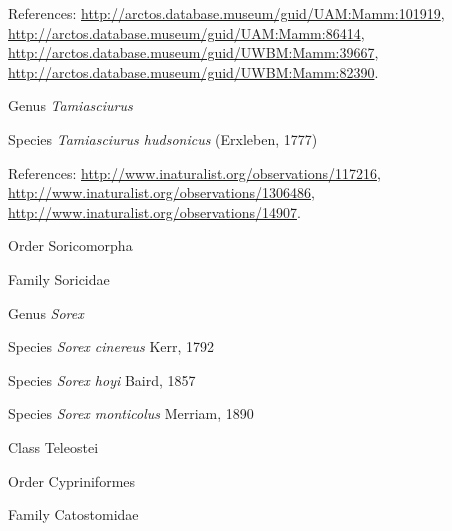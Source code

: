 \documentclass[9pt, article]{memoir}
\begin{document}
\begin{multicols}{2}
\vspace{6pt}References: 
\url{http://arctos.database.museum/guid/UAM:Mamm:101919}, 
\url{http://arctos.database.museum/guid/UAM:Mamm:86414}, 
\url{http://arctos.database.museum/guid/UWBM:Mamm:39667}, 
\url{http://arctos.database.museum/guid/UWBM:Mamm:82390}.

\vspace{6pt}\noindent\hspace{30pt}Genus \textit{Tamiasciurus}


\vspace{6pt}\noindent\hspace{36pt}Species \textit{Tamiasciurus hudsonicus} (Erxleben, 1777)


\vspace{6pt}References: 
\url{http://www.inaturalist.org/observations/117216}, 
\url{http://www.inaturalist.org/observations/1306486}, 
\url{http://www.inaturalist.org/observations/14907}.

\vspace{6pt}\noindent\hspace{18pt}Order Soricomorpha


\vspace{6pt}\noindent\hspace{24pt}Family Soricidae


\vspace{6pt}\noindent\hspace{30pt}Genus \textit{Sorex}


\vspace{6pt}\noindent\hspace{36pt}Species \textit{Sorex cinereus} Kerr, 1792


\vspace{6pt}\noindent\hspace{36pt}Species \textit{Sorex hoyi} Baird, 1857


\vspace{6pt}\noindent\hspace{36pt}Species \textit{Sorex monticolus} Merriam, 1890


\vspace{6pt}\noindent\hspace{12pt}Class Teleostei


\vspace{6pt}\noindent\hspace{18pt}Order Cypriniformes


\vspace{6pt}\noindent\hspace{24pt}Family Catostomidae



\end{multicols}
\end{document}

